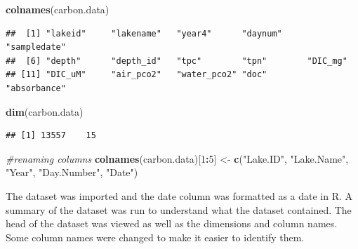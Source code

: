 \documentclass[12pt,]{article}
\newenvironment{Shaded}{\begin{snugshade}}{\end{snugshade}}
\newcommand{\KeywordTok}[1]{\textcolor[rgb]{0.13,0.29,0.53}{\textbf{#1}}}
\newcommand{\DecValTok}[1]{\textcolor[rgb]{0.00,0.00,0.81}{#1}}
\newcommand{\StringTok}[1]{\textcolor[rgb]{0.31,0.60,0.02}{#1}}
\newcommand{\CommentTok}[1]{\textcolor[rgb]{0.56,0.35,0.01}{\textit{#1}}}
\newcommand{\OperatorTok}[1]{\textcolor[rgb]{0.81,0.36,0.00}{\textbf{#1}}}
\newcommand{\NormalTok}[1]{#1}
\begin{document}
\begin{Shaded}
\begin{Highlighting}[]
\KeywordTok{colnames}\NormalTok{(carbon.data)}
\end{Highlighting}
\end{Shaded}

\begin{verbatim}
##  [1] "lakeid"     "lakename"   "year4"      "daynum"     "sampledate"
##  [6] "depth"      "depth_id"   "tpc"        "tpn"        "DIC_mg"    
## [11] "DIC_uM"     "air_pco2"   "water_pco2" "doc"        "absorbance"
\end{verbatim}

\begin{Shaded}
\begin{Highlighting}[]
\KeywordTok{dim}\NormalTok{(carbon.data)}
\end{Highlighting}
\end{Shaded}

\begin{verbatim}
## [1] 13557    15
\end{verbatim}

\begin{Shaded}
\begin{Highlighting}[]
\CommentTok{#renaming columns}
\KeywordTok{colnames}\NormalTok{(carbon.data)[}\DecValTok{1}\OperatorTok{:}\DecValTok{5}\NormalTok{] <-}\StringTok{ }\KeywordTok{c}\NormalTok{(}\StringTok{"Lake.ID"}\NormalTok{, }\StringTok{"Lake.Name"}\NormalTok{, }\StringTok{"Year"}\NormalTok{, }\StringTok{"Day.Number"}\NormalTok{, }\StringTok{"Date"}\NormalTok{)}
\end{Highlighting}
\end{Shaded}

The dataset was imported and the date column was formatted as a date in
R. A summary of the dataset was run to understand what the dataset
contained. The head of the dataset was viewed as well as the dimensions
and column names. Some column names were changed to make it easier to
identify them.
\end{document}
